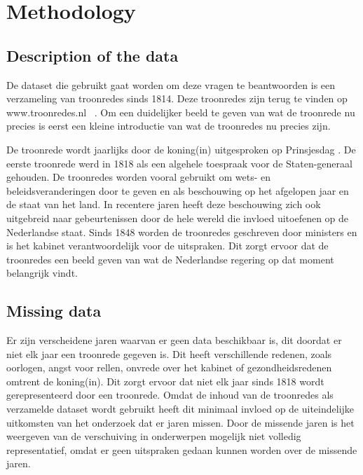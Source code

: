 \section{Methodology}
\label{sec:meth}


\subsection{Description of the data}
De dataset die gebruikt gaat worden om deze vragen te beantwoorden is een verzameling van troonredes sinds 1814. Deze troonredes zijn terug te vinden op www.troonredes.nl~\citep{troonredes} . Om een duidelijker beeld te geven van wat de troonrede nu precies is eerst een kleine introductie van wat de troonredes nu precies zijn. 

De troonrede wordt jaarlijks door de koning(in) uitgesproken op Prinsjesdag . De eerste troonrede werd in 1818 als een algehele toespraak voor de Staten-generaal gehouden. De troonredes worden vooral gebruikt om wets- en beleidsveranderingen door te geven en als beschouwing op het afgelopen jaar en de staat van het land.  In recentere jaren heeft deze beschouwing zich ook uitgebreid naar gebeurtenissen door de hele wereld die invloed uitoefenen op de Nederlandse staat. Sinds 1848 worden de troonredes geschreven door ministers  en is het kabinet verantwoordelijk voor de uitspraken. Dit zorgt ervoor dat de troonredes een beeld geven van wat de Nederlandse regering op dat moment belangrijk vindt.

\subsection{Missing data}
Er zijn verscheidene jaren waarvan er geen data beschikbaar is, dit doordat er niet elk jaar een troonrede gegeven is. Dit heeft verschillende redenen, zoals oorlogen, angst voor rellen, onvrede over het kabinet of gezondheidsredenen omtrent de koning(in). Dit zorgt ervoor dat niet elk jaar sinds 1818 wordt gerepresenteerd door een troonrede. Omdat de inhoud van de troonredes als verzamelde dataset wordt gebruikt heeft dit minimaal invloed op de uiteindelijke uitkomsten van het onderzoek dat er jaren missen. Door de missende jaren is het weergeven van de verschuiving in onderwerpen mogelijk niet volledig representatief, omdat er geen uitspraken gedaan kunnen worden over de missende jaren.


